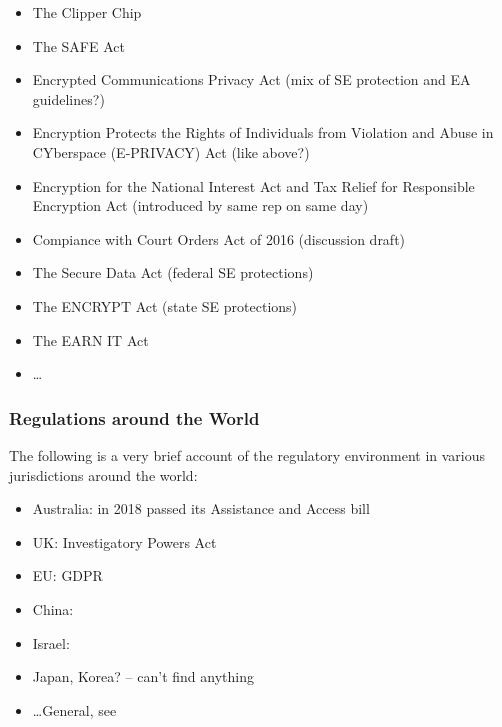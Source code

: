 \begin{itemize}
    \item The Clipper Chip \cite{press_1993} \cite{thompson_2015}
    \item The SAFE Act \cite{goodlatte_hr3011_1996}
    \item Encrypted Communications Privacy Act (mix of SE protection and EA guidelines?) \cite{leahy_s376_1997}
    \item Encryption Protects the Rights of Individuals from Violation and Abuse in CYberspace (E-PRIVACY) Act
        (like above?) \cite{ashcroft_s2067_1998}
    \item Encryption for the National Interest Act and Tax Relief for Responsible Encryption Act (introduced by same rep
        on same day) \cite{goss_hr2616_1999} \cite{goss_hr2617_1999}
    \item Compiance with Court Orders Act of 2016 (discussion draft) \cite{burr_2016}
    \item The Secure Data Act (federal SE protections) \cite{lofgren_hr5823_2018}
    \item The ENCRYPT Act (state SE protections) \cite{lieu_hr4170_2019}
    \item The EARN IT Act \cite{graham_s3398_2020}
    \item \dots
\end{itemize}

\subsubsection*{Regulations around the World}

The following is a very brief account of the regulatory environment in various jurisdictions around the world:

\begin{itemize}
    \item Australia: in 2018 passed its Assistance and Access bill \cite{ag_2018} \cite{newman_2018}
    \item UK: Investigatory Powers Act \cite{legislature_2016}
    \item EU: GDPR \cite{parliament_2016}
    \item China: \cite{donahue_comparative_2018}
    \item Israel: \cite{donahue_comparative_2018}
    \item Japan, Korea? -- can't find anything
    \item \dots General, see \cite{budish_encryption_2018}
\end{itemize}

